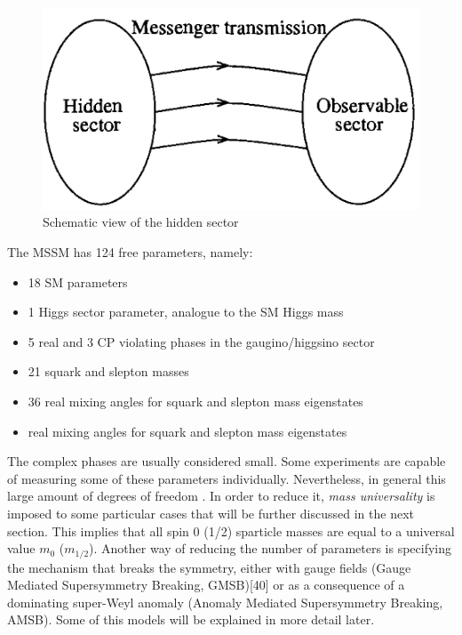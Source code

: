 \begin{figure} [htb!]
\begin{center}
\includegraphics[scale=0.5]{figs/hidden_sector.png}
\caption{Schematic view of the hidden sector \label{fig:hiddensector}}
\end{center}
\end{figure}

The MSSM has 124 free parameters, namely:

\begin{itemize}
\item 18 SM parameters
\item 1 Higgs sector parameter, analogue to the SM Higgs mass
\item 5 real and 3 CP violating phases in the gaugino/higgsino sector
\item 21 squark and slepton masses
\item 36 real mixing angles for squark and slepton mass eigenstates
\item real mixing angles for squark and slepton mass eigenstates
\end{itemize}

The complex phases are usually considered small. Some experiments are capable of measuring some of these parameters individually. Nevertheless, in general this large amount of degrees of freedom . In order to reduce it, \textit{mass universality} is imposed to some particular cases that will be further discussed in the next section. This implies that all spin 0 (1/2) sparticle masses are equal to a universal value $m_0$ ($m_{1/2}$). Another way of reducing the number of parameters is specifying the mechanism that breaks the symmetry, either with gauge fields (Gauge Mediated Supersymmetry Breaking, GMSB)[40] or as a consequence of a dominating super-Weyl anomaly (Anomaly Mediated Supersymmetry Breaking, AMSB). Some of this models will be explained in more detail later. 

